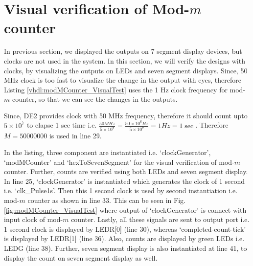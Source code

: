 


\section{Visual verification of Mod-$m$ counter}\label{sec:modMCounterVisualTest}
In previous section, we displayed the outputs on 7 segment display devices, but clocks are not used in the system. In this section, we will verify the designs with clocks, by visualizing the outputs on LEDs and seven segment displays. Since, 50 MHz clock is too fast to visualize the change in the output with eyes, therefore Listing \ref{vhdl:modMCounter_VisualTest} uses the 1 Hz clock frequency for mod-$m$ counter, so that we can see the changes in the outputs. 

\begin{explanation}
	Since, DE2 provides clock with 50 MHz frequency, therefore it should count upto $5 \times 10^7$ to elapse 1 sec time i.e. $\frac{{50MHz}}{{5 \times {{10}^7}}} = \frac{{50 \times {{10}^6}Hz}}{{5 \times {{10}^7}}} = 1Hz = 1\sec $. Therefore $M=50000000$ is used in line 29.   
	
	In the listing, three component are instantiated i.e. `clockGenerator', `modMCounter' and `hexToSevenSegment' for the visual verification of mod-$m$ counter. Further, counts are verified using both LEDs and seven segment display. In line 25, `clockGenerator' is instantiated which generates the clock of 1 second i.e. `clk\_Pulse1s'. Then this 1 second clock is used by second instantiation i.e. mod-$m$ counter as shown in line 33. This can be seen in Fig. \ref{fig:modMCounter_VisualTest} where output of `clockGenerator' is connect with input clock of mod-$m$ counter. Lastly, all these signals are sent to output port i.e. 1 second clock is displayed by LEDR[0] (line 30), whereas `completed-count-tick' is displayed by LEDR[1] (line 36). Also, counts are displayed by green LEDs i.e. LEDG (line 38).  Further, seven segment display is also instantiated at line 41, to display the count on seven segment display as well. 
\end{explanation}



